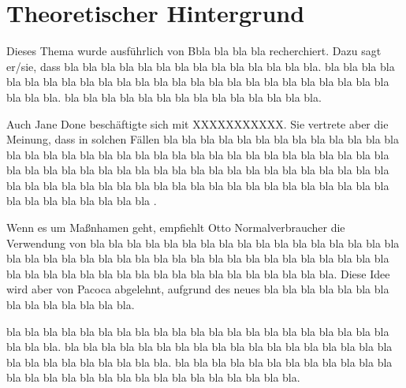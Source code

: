 \section{Theoretischer Hintergrund}

Dieses Thema wurde ausführlich von Bbla bla bla bla recherchiert. Dazu sagt er/sie, dass bla bla bla bla 
bla bla bla bla bla bla bla bla bla bla. bla bla bla bla bla bla bla bla bla bla bla bla bla bla 
bla bla bla bla bla bla bla bla bla bla bla bla bla bla. bla bla bla bla bla bla bla bla bla bla bla bla bla bla.

Auch Jane Done beschäftigte sich mit XXXXXXXXXXX. Sie vertrete aber die Meinung, dass in solchen Fällen 
bla bla bla bla bla bla bla bla bla bla bla bla bla bla bla bla bla bla bla bla bla bla bla bla bla bla bla bla 
bla bla bla bla bla bla bla bla bla bla bla bla bla bla bla bla bla bla bla bla bla bla bla bla bla bla bla bla 
bla bla bla bla bla bla bla bla bla bla bla bla bla bla bla bla bla bla bla bla bla bla bla bla bla bla bla bla .

Wenn es um Maßnhamen geht, empfiehlt Otto Normalverbraucher die Verwendung von bla bla bla bla bla bla bla 
bla bla bla bla bla bla bla bla bla bla bla bla bla bla bla bla bla bla bla bla bla  bla bla bla bla bla bla bla
 bla bla bla bla bla bla bla bla bla bla bla bla bla bla bla bla bla bla bla bla bla. Diese Idee wird aber von Pacoca
 abgelehnt, aufgrund des neues bla bla bla bla bla bla bla bla bla bla bla bla bla bla.

bla bla bla bla bla bla bla bla bla bla bla bla bla bla bla bla bla bla bla bla bla bla bla bla.
bla bla bla bla bla bla bla bla bla bla bla bla bla bla bla bla bla bla bla bla bla bla bla bla bla bla bla.
bla bla bla bla bla bla bla bla bla bla bla bla bla bla bla bla bla bla bla bla bla bla bla bla bla bla bla bla.


